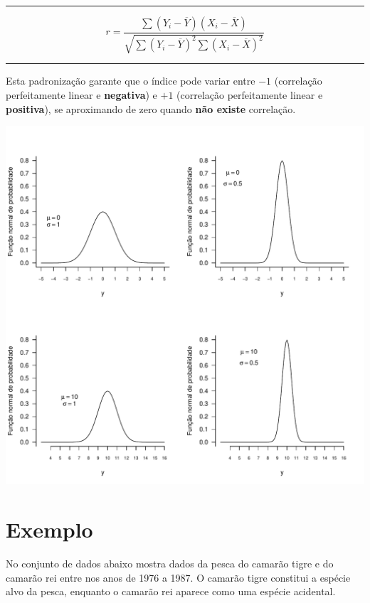 \documentclass[
]{book}
\begin{document}
\begin{center}\rule{0.5\linewidth}{0.5pt}\end{center}

\[r = \frac{\sum{(Y_i - \overline{Y})(X_i - \overline{X})}}{\sqrt{\sum{(Y_i - \overline{Y})^2 \sum{(X_i - \overline{X})^2}}}}\]

\begin{center}\rule{0.5\linewidth}{0.5pt}\end{center}

Esta padronização garante que o índice pode variar entre \(-1\) (correlação perfeitamente linear e \textbf{negativa}) e \(+1\) (correlação perfeitamente linear e \textbf{positiva}), se aproximando de zero quando \textbf{não existe} correlação.

\begin{center}\includegraphics{probest-cambientais_files/figure-latex/unnamed-chunk-204-1} \end{center}

\hypertarget{exemplo}{%
\section{Exemplo}\label{exemplo}}

No conjunto de dados abaixo \citep{haddon2010modelling} mostra dados da pesca do camarão tigre e do camarão rei entre nos anos de 1976 a 1987. O camarão tigre constitui a espécie alvo da pesca, enquanto o camarão rei aparece como uma espécie acidental.
\end{document}

